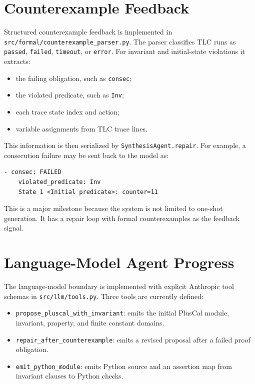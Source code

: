 \documentclass[11pt]{article}
\begin{document}
\section{Counterexample Feedback}

Structured counterexample feedback is implemented in
\texttt{src/formal/counterexample\_parser.py}. The parser classifies TLC runs
as \texttt{passed}, \texttt{failed}, \texttt{timeout}, or \texttt{error}. For
invariant and initial-state violations it extracts:

\begin{itemize}
  \item the failing obligation, such as \texttt{consec};
  \item the violated predicate, such as \texttt{Inv};
  \item each trace state index and action;
  \item variable assignments from TLC trace lines.
\end{itemize}

This information is then serialized by \texttt{SynthesisAgent.repair}. For
example, a consecution failure may be sent back to the model as:

\begin{lstlisting}
- consec: FAILED
    violated_predicate: Inv
    State 1 <Initial predicate>: counter=11
\end{lstlisting}

This is a major milestone because the system is not limited to one-shot
generation. It has a repair loop with formal counterexamples as the feedback
signal.

\section{Language-Model Agent Progress}

The language-model boundary is implemented with explicit Anthropic tool
schemas in \texttt{src/llm/tools.py}. Three tools are currently defined:

\begin{itemize}
  \item \texttt{propose\_pluscal\_with\_invariant}: emits the initial PlusCal
  module, invariant, property, and finite constant domains.
  \item \texttt{repair\_after\_counterexample}: emits a revised proposal after
  a failed proof obligation.
  \item \texttt{emit\_python\_module}: emits Python source and an assertion map
  from invariant clauses to Python checks.
\end{itemize}
\end{document}
